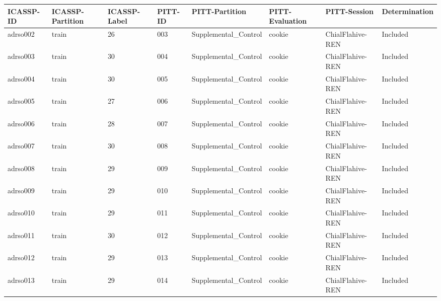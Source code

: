\begin{center}
\tiny
\begin{longtable}{|l|l|l|l|l|l|l|l|}
\hline
ICASSP-ID & ICASSP-Partition & ICASSP-Label & PITT-ID     & PITT-Partition       & PITT-Evaluation & PITT-Session     & Determination \\ \hline
adrso002  & train            & 26           & 003         & Supplemental\_Control & cookie          & ChialFlahive-REN & Included      \\ \hline
adrso003  & train            & 30           & 004         & Supplemental\_Control & cookie          & ChialFlahive-REN & Included      \\ \hline
adrso004  & train            & 30           & 005         & Supplemental\_Control & cookie          & ChialFlahive-REN & Included      \\ \hline
adrso005  & train            & 27           & 006         & Supplemental\_Control & cookie          & ChialFlahive-REN & Included      \\ \hline
adrso006  & train            & 28           & 007         & Supplemental\_Control & cookie          & ChialFlahive-REN & Included      \\ \hline
adrso007  & train            & 30           & 008         & Supplemental\_Control & cookie          & ChialFlahive-REN & Included      \\ \hline
adrso008  & train            & 29           & 009         & Supplemental\_Control & cookie          & ChialFlahive-REN & Included      \\ \hline
adrso009  & train            & 29           & 010         & Supplemental\_Control & cookie          & ChialFlahive-REN & Included      \\ \hline
adrso010  & train            & 29           & 011         & Supplemental\_Control & cookie          & ChialFlahive-REN & Included      \\ \hline
adrso011  & train            & 30           & 012         & Supplemental\_Control & cookie          & ChialFlahive-REN & Included      \\ \hline
adrso012  & train            & 29           & 013         & Supplemental\_Control & cookie          & ChialFlahive-REN & Included      \\ \hline
adrso013  & train            & 29           & 014         & Supplemental\_Control & cookie          & ChialFlahive-REN & Included      \\ \hline

\end{longtable}
\end{center}
